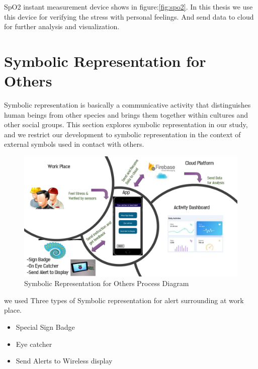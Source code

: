 \acs{SpO2} instant measurement device shows in figure:\ref{fig:spo2}. In this thesis we use this device for verifying the stress with personal feelings. And send data to cloud for further analysis and visualization.

\section{Symbolic Representation for Others}
Symbolic representation is basically a communicative activity that distinguishes human beings from other species and brings them together within cultures and other social groups. This section explores symbolic representation in our study, and we restrict our development to symbolic representation in the context of external symbols used in contact with others.
\begin{figure}[hbt!] 
  \centering
  \includegraphics[width=1.0\linewidth]{chap4/image4/sign.pdf}
  \caption[Symbolic Representation for Others Process Diagram ]{Symbolic Representation for Others Process Diagram}
  \label{fig:Sign}
\end{figure}
we used Three types of Symbolic representation for alert surrounding at work place.
\begin{itemize}
    \item Special Sign Badge
    \item Eye catcher
    \item Send Alerts to Wireless display
\end{itemize}

